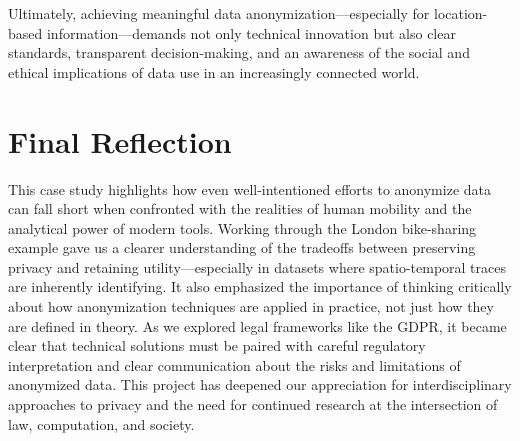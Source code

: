 \documentclass[twocolumn]{article}
\begin{document}
Ultimately, achieving meaningful data anonymization—especially for location-based information—demands not only technical innovation but also clear standards, transparent decision-making, and an awareness of the social and ethical implications of data use in an increasingly connected world.


\section{Final Reflection} \label{Final Reflection}

This case study highlights how even well-intentioned efforts to anonymize data can fall short when confronted with the realities of human mobility and the analytical power of modern tools. Working through the London bike-sharing example gave us a clearer understanding of the tradeoffs between preserving privacy and retaining utility—especially in datasets where spatio-temporal traces are inherently identifying. It also emphasized the importance of thinking critically about how anonymization techniques are applied in practice, not just how they are defined in theory. As we explored legal frameworks like the GDPR, it became clear that technical solutions must be paired with careful regulatory interpretation and clear communication about the risks and limitations of anonymized data. This project has deepened our appreciation for interdisciplinary approaches to privacy and the need for continued research at the intersection of law, computation, and society.



\end{document}

